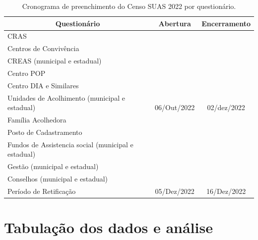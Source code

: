 \documentclass[
  brazilian]{report}
\begin{document}
\begin{table}[h]
\centering
\caption{Cronograma de preenchimento do Censo SUAS 2022 por questionário.}
\label{tab:cronograma}
\begin{tabular}{|l|c|c|}
\hline
\multicolumn{1}{|c|}{Questionário} & Abertura                      & Encerramento                  \\ \hline
CRAS                               & \multirow{11}{*}{06/Out/2022} & \multirow{11}{*}{02/dez/2022} \\ \cline{1-1}
Centros de Convivência             &                               &                               \\ \cline{1-1}
CREAS (municipal e estadual)       &                               &                               \\ \cline{1-1}
Centro POP                         &                               &                               \\ \cline{1-1}
Centro DIA e Similares             &                               &                               \\ \cline{1-1}
Unidades de Acolhimento
(municipal e estadual)             &                               &                               \\ \cline{1-1}
Família Acolhedora                 &                               &                               \\ \cline{1-1}
Posto de Cadastramento             &                               &                               \\ \cline{1-1}
Fundos de Assistencia social
(municipal e estadual)             &                               &                               \\ \cline{1-1}
Gestão (municipal e estadual)      &                               &                               \\ \cline{1-1}
Conselhos (municipal e estadual)   &                               &                               \\ \hline
\hline
Período de Retificação             & 05/Dez/2022                   & 16/Dez/2022                   \\ \hline
\end{tabular}
\end{table}

\hypertarget{tabulauxe7uxe3o-dos-dados-e-anuxe1lise}{%
\section{Tabulação dos dados e
análise}\label{tabulauxe7uxe3o-dos-dados-e-anuxe1lise}}
\end{document}
